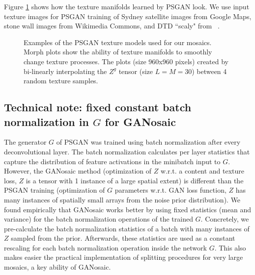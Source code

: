 \documentclass{article}
\begin{document}
Figure \ref{fig_text} shows how the texture manifolds learned by PSGAN look. We use input texture images for PSGAN training of Sydney satellite images from Google Maps, stone wall images from Wikimedia Commons, and DTD ``scaly" from ~\cite{cimpoi14describing}.

\begin{figure}
\centering
{} 
\caption{Examples of the PSGAN texture models used for our mosaics. Morph plots show the ability of texture manifolds to smoothly change texture processes. The plots (size 960x960 pixels) created by bi-linearly interpolating the $Z^g$ tensor (size $L=M=30$) between 4 random texture samples.}
\label{fig_text}
\end{figure}

\subsection*{Technical note: fixed constant batch normalization in $G$ for GANosaic}
The generator $G$ of PSGAN was trained using batch normalization after every deconvolutional layer. 
The batch normalization calculates per layer statistics that capture the distribution of feature activations in the minibatch input to $G$. 
However, the GANosaic method (optimization of $Z$ w.r.t. a content and texture loss, $Z$ is a tensor with 1 instance of a large spatial extent) is different than the PSGAN training (optimization of $G$ parameters w.r.t. GAN loss function, $Z$ has many instances of spatially small arrays from the noise prior distribution). We found empirically that GANosaic  works better by using fixed statistics (mean and variance) for the batch normalization operations of the trained $G$. 
Concretely, we pre-calculate the batch normalization statistics of a  batch with many instances of $Z$ sampled from the prior. Afterwards,  these statistics are used as a constant rescaling for each batch normalization operation inside the network $G$. 
This also makes easier the practical implementation of splitting procedures \citep{SGAN2016} for very large mosaics, a key ability of GANosaic.
\end{document}
